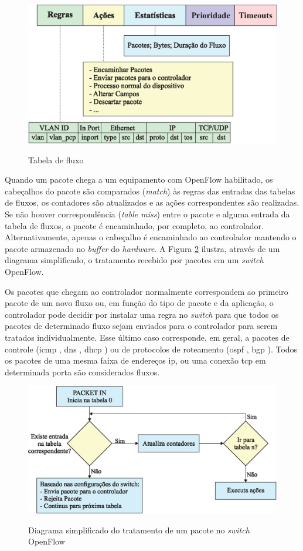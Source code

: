 \begin{figure}[H]
  \centering
  \caption{Tabela de fluxo}
  \includegraphics[width=.65\textwidth]{images/flow-table.eps}
  \label{fig:flow-table}
\end{figure}
\FloatBarrier
Quando um pacote chega a um equipamento com OpenFlow habilitado, os cabeçalhos do pacote são comparados (\textit{match}) às regras das entradas das tabelas de fluxos, os contadores são atualizados e as ações correspondentes são realizadas. Se não houver correspondência  (\textit{table miss}) entre o pacote e alguma entrada da tabela de fluxos, o pacote é encaminhado, por completo, ao controlador. Alternativamente, apenas o cabeçalho é encaminhado ao controlador mantendo o pacote armazenado no \textit{buffer} do \textit{hardware}. A Figura \ref{fig:fluxo-tmp} ilustra, através de um diagrama simplificado, o tratamento recebido por pacotes em um \textit{switch} OpenFlow.

Os pacotes que chegam ao controlador normalmente correspondem ao primeiro pacote de um novo fluxo ou, em função do tipo de pacote e da aplicação, o controlador pode decidir por instalar uma regra no \textit{switch} para que todos os pacotes de determinado fluxo sejam enviados para o controlador para serem tratados individualmente. Esse último caso corresponde, em geral, a pacotes de controle  (\gls{icmp} \cite{RFC0792}, \gls{dns} \cite{RFC7719}, \gls{dhcp} \cite{RFC2131}) ou de protocolos de roteamento  (\gls{ospf} \cite{RFC2328}, \gls{bgp} \cite{RFC4271}).
Todos os pacotes de uma mesma faixa de endereços \gls{ip}, ou uma conexão \gls{tcp} em determinada porta são considerados fluxos.

\begin{figure}[H]
  \centering
  \caption{Diagrama simplificado do tratamento de um pacote no \textit{switch} OpenFlow}
  \includegraphics[width=.80\textwidth]{images/flow.eps}
  \label{fig:fluxo-tmp}
\end{figure}
\FloatBarrier

